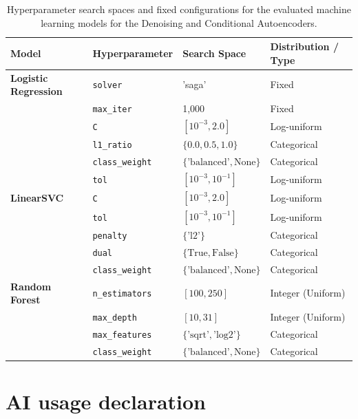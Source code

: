 \documentclass[11pt]{article}
\begin{document}
\begin{table}[htbp]
\centering
\caption{Hyperparameter search spaces and fixed configurations for the evaluated machine learning models for the Denoising and Conditional Autoencoders.}\label{tab:ae_ml_hyperparameters} %
\label{tab:hyperparameters}
\begin{tabular}{llll}
\toprule
\textbf{Model} & \textbf{Hyperparameter} & \textbf{Search Space} & \textbf{Distribution / Type} \\
\midrule
\textbf{Logistic Regression} & \texttt{solver} & 'saga' & Fixed \\
 & \texttt{max\_iter} & 1,000 & Fixed \\
 & \texttt{C} & $[10^{-3}, 2.0]$ & Log-uniform \\
 & \texttt{l1\_ratio} & $\{0.0, 0.5, 1.0\}$ & Categorical \\
 & \texttt{class\_weight} & $\{\text{'balanced'}, \text{None}\}$ & Categorical \\
 & \texttt{tol} & $[10^{-3}, 10^{-1}]$ & Log-uniform \\
\midrule
\textbf{LinearSVC} & \texttt{C} & $[10^{-3}, 2.0]$ & Log-uniform \\
 & \texttt{tol} & $[10^{-3}, 10^{-1}]$ & Log-uniform \\
 & \texttt{penalty} & $\{\text{'l2'}\}$ & Categorical \\
 & \texttt{dual} & $\{\text{True}, \text{False}\}$ & Categorical \\
 & \texttt{class\_weight} & $\{\text{'balanced'}, \text{None}\}$ & Categorical \\
\midrule
\textbf{Random Forest} & \texttt{n\_estimators} & $[100, 250]$ & Integer (Uniform) \\
 & \texttt{max\_depth} & $[10, 31]$ & Integer (Uniform) \\
 & \texttt{max\_features} & $\{\text{'sqrt'}, \text{'log2'}\}$ & Categorical \\
 & \texttt{class\_weight} & $\{\text{'balanced'}, \text{None}\}$ & Categorical \\
\bottomrule
\end{tabular}
\end{table}

\clearpage

\section{AI usage declaration}\label{sec:ai-declaration}
\end{document}
